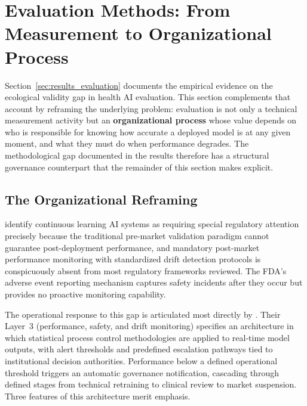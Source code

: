 
\section{Evaluation Methods: From Measurement to Organizational Process}
\label{sec:evaluation_methods}

Section~\ref{sec:results_evaluation} documents the empirical evidence on
the ecological validity gap in health AI evaluation. This section complements
that account by reframing the underlying problem: evaluation is not only a
technical measurement activity but an \textbf{organizational process} whose
value depends on who is responsible for knowing how accurate a deployed
model is at any given moment, and what they must do when performance
degrades. The methodological gap documented in the results therefore has
a structural governance counterpart that the remainder of this section
makes explicit.

\subsection{The Organizational Reframing}

\citet{warraich2024fda} identify continuous learning AI systems as requiring
special regulatory attention precisely because the traditional pre-market
validation paradigm cannot guarantee post-deployment performance, and
mandatory post-market performance monitoring with standardized drift
detection protocols is conspicuously absent from most regulatory frameworks
reviewed. The FDA's adverse event reporting mechanism captures safety
incidents after they occur but provides no proactive monitoring capability.

The operational response to this gap is articulated most directly by
\citet{palama2026auditing}. Their Layer~3 (performance, safety, and drift
monitoring) specifies an architecture in which statistical process control
methodologies are applied to real-time model outputs, with alert thresholds
and predefined escalation pathways tied to institutional decision authorities.
Performance below a defined operational threshold triggers an automatic
governance notification, cascading through defined stages from technical
retraining to clinical review to market suspension. Three features of this
architecture merit emphasis.

